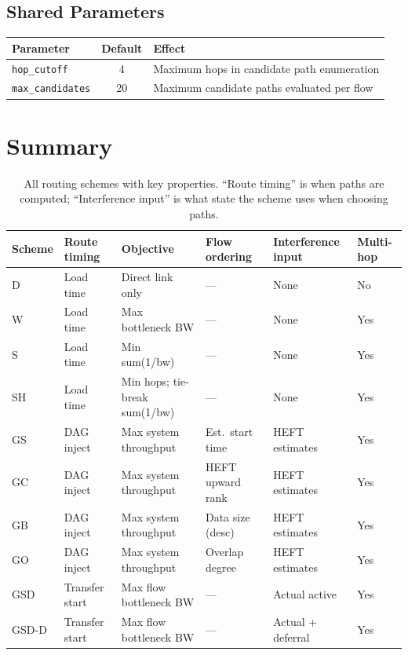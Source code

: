\documentclass[11pt]{article}
\begin{document}
\subsection{Shared Parameters}

\begin{tabular}{@{}lcp{7cm}@{}}
\toprule
\textbf{Parameter} & \textbf{Default} & \textbf{Effect} \\
\midrule
\texttt{hop\_cutoff}     & 4  & Maximum hops in candidate path enumeration \\
\texttt{max\_candidates} & 20 & Maximum candidate paths evaluated per flow \\
\bottomrule
\end{tabular}

\section{Summary}

\begin{table}[h]
\centering
\small
\begin{tabular}{llllll}
\toprule
\textbf{Scheme} & \textbf{Route timing} & \textbf{Objective} & \textbf{Flow ordering} & \textbf{Interference input} & \textbf{Multi-hop} \\
\midrule
D     & Load time       & Direct link only           & ---              & None              & No  \\
W     & Load time       & Max bottleneck BW           & ---              & None              & Yes \\
S     & Load time       & Min sum(1/bw)               & ---              & None              & Yes \\
SH    & Load time       & Min hops; tie-break sum(1/bw) & ---            & None              & Yes \\
GS    & DAG inject      & Max system throughput       & Est.\ start time & HEFT estimates    & Yes \\
GC    & DAG inject      & Max system throughput       & HEFT upward rank & HEFT estimates    & Yes \\
GB    & DAG inject      & Max system throughput       & Data size (desc) & HEFT estimates    & Yes \\
GO    & DAG inject      & Max system throughput       & Overlap degree   & HEFT estimates    & Yes \\
GSD   & Transfer start  & Max flow bottleneck BW      & ---              & Actual active     & Yes \\
GSD-D & Transfer start  & Max flow bottleneck BW      & ---              & Actual + deferral & Yes \\
\bottomrule
\end{tabular}
\caption{All routing schemes with key properties.  ``Route timing'' is when
paths are computed; ``Interference input'' is what state the scheme uses
when choosing paths.}
\end{table}
\end{document}
